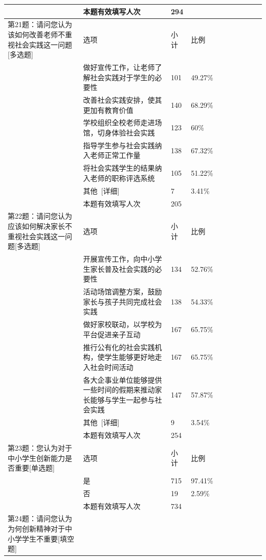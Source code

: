 \documentclass[12pt,UTF8]{ctexart}
\begin{document}
{\begin{spacing}{01}
\begin{longtable}{p{3.5cm}p{2cm}p{1.5cm}p{1.5cm}p{1.5cm}p{1.5cm}p{1.5cm}p{1cm}}
			~ & 本题有效填写人次 & 294 & ~ & ~ & ~ & ~ & ~ \\ \hline
			第21题：请问您认为该如何改善老师不重视社会实践这一问题[多选题] & 选项 & 小计 & 比例 & ~ & ~ & ~ & ~ \\ \hline
			~ & 做好宣传工作，让老师了解社会实践对于学生的必要性 & 101 & 49.27\% & ~ & ~ & ~ & ~ \\ \hline
			~ & 改善社会实践安排，使其更加有教育价值 & 140 & 68.29\% & ~ & ~ & ~ & ~ \\ \hline
			~ & 学校组织全校老师走进场馆，切身体验社会实践 & 123 & 60\% & ~ & ~ & ~ & ~ \\ \hline
			~ & 指导学生参与社会实践纳入老师正常工作量 & 138 & 67.32\% & ~ & ~ & ~ & ~ \\ \hline
			~ & 将社会实践学生的结果纳入老师的职称评选系统 & 105 & 51.22\% & ~ & ~ & ~ & ~ \\ \hline
			~ & 其他 [详细] & 7 & 3.41\% & ~ & ~ & ~ & ~ \\ \hline
			~ & 本题有效填写人次 & 205 & ~ & ~ & ~ & ~ & ~ \\ \hline
			第22题：请问您认为应该如何解决家长不重视社会实践这一问题[多选题] & 选项 & 小计 & 比例 & ~ & ~ & ~ & ~ \\ \hline
			~ & 开展宣传工作，向中小学生家长普及社会实践的必要性 & 134 & 52.76\% & ~ & ~ & ~ & ~ \\ \hline
			~ & 活动场馆调整方案，鼓励家长与孩子共同完成社会实践 & 138 & 54.33\% & ~ & ~ & ~ & ~ \\ \hline
			~ & 做好家校联动，以学校为平台促进亲子互动 & 167 & 65.75\% & ~ & ~ & ~ & ~ \\ \hline
			~ & 推行公有化的社会实践机构，使学生能够更好地走入社会时间活动 & 167 & 65.75\% & ~ & ~ & ~ & ~ \\ \hline
			~ & 各大企事业单位能够提供一些时间的假期来推动家长能够与学生一起参与社会实践 & 147 & 57.87\% & ~ & ~ & ~ & ~ \\
			\hline
			~ & 其他 [详细] & 9 & 3.54\% & ~ & ~ & ~ & ~ \\ \hline
			~ & 本题有效填写人次 & 254 & ~ & ~ & ~ & ~ & ~ \\ \hline
			第23题：您认为对于中小学生创新能力是否重要[单选题] & 选项 & 小计 & 比例 & ~ & ~ & ~ & ~ \\ \hline
			~ & 是 & 715 & 97.41\% & ~ & ~ & ~ & ~ \\ \hline
			~ & 否 & 19 & 2.59\% & ~ & ~ & ~ & ~ \\ \hline
			~ & 本题有效填写人次 & 734 & ~ & ~ & ~ & ~ & ~ \\ \hline
			第24题：请问您认为为何创新精神对于中小学学生不重要[填空题] & ~ & ~ & ~ & ~ & ~ & ~ & ~ \\ \hline

\end{longtable}
\end{spacing}}
\end{document}
